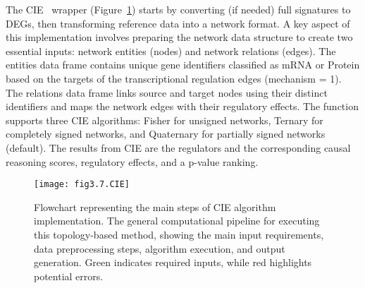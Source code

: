 The \gls{CIE}~\cite{RN81} wrapper (Figure~\ref{fig:fig3.7.CIE}) starts by converting (if needed) full signatures to DEGs, then transforming reference data into a network format. A key aspect of this implementation involves preparing the network data structure to create two essential inputs: network entities (nodes) and network relations (edges). The entities data frame contains unique gene identifiers classified as mRNA or Protein based on the targets of the transcriptional regulation edges (mechanism = 1). The relations data frame links source and target nodes using their distinct identifiers and maps the network edges with their regulatory effects. The function supports three CIE algorithms: Fisher for unsigned networks, Ternary for completely signed networks, and Quaternary for partially signed networks (default). The results from CIE are the regulators and the corresponding causal reasoning scores, regulatory effects, and a p-value ranking.


\begin{figure}[htbp]
    \centering
    \texttt{[image: fig3.7.CIE]}
    \caption[Flowchart representing the main steps of CIE algorithm implementation.]{Flowchart representing the main steps of CIE algorithm implementation. The general computational pipeline for executing this topology-based method, showing the main input requirements, data preprocessing steps, algorithm execution, and output generation. Green indicates required inputs, while red highlights potential errors.}
    \label{fig:fig3.7.CIE}
\end{figure}

